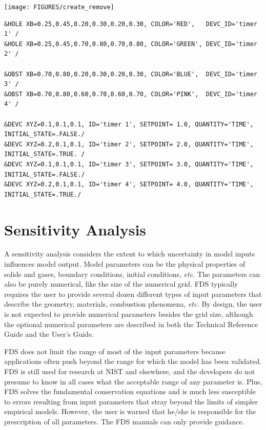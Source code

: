 \documentclass[11pt]{book}
\begin{document}
\vspace{0.2in}
\tiny
\noindent
\begin{minipage}{1.4in}
\texttt{[image: FIGURES/create\_remove]}
\end{minipage}
\hfill
\begin{minipage}{5.5in}
\begin{verbatim}
&HOLE XB=0.25,0.45,0.20,0.30,0.20,0.30, COLOR='RED',   DEVC_ID='timer 1' /
&HOLE XB=0.25,0.45,0.70,0.80,0.70,0.80, COLOR='GREEN', DEVC_ID='timer 2' /

&OBST XB=0.70,0.80,0.20,0.30,0.20,0.30, COLOR='BLUE',  DEVC_ID='timer 3' /
&OBST XB=0.70,0.80,0.60,0.70,0.60,0.70, COLOR='PINK',  DEVC_ID='timer 4' /

&DEVC XYZ=0.1,0.1,0.1, ID='timer 1', SETPOINT= 1.0, QUANTITY='TIME', INITIAL_STATE=.FALSE./
&DEVC XYZ=0.2,0.1,0.1, ID='timer 2', SETPOINT= 2.0, QUANTITY='TIME', INITIAL_STATE=.TRUE. /
&DEVC XYZ=0.1,0.1,0.1, ID='timer 3', SETPOINT= 3.0, QUANTITY='TIME', INITIAL_STATE=.FALSE./
&DEVC XYZ=0.2,0.1,0.1, ID='timer 4', SETPOINT= 4.0, QUANTITY='TIME', INITIAL_STATE=.TRUE./
\end{verbatim}
\end{minipage}
\normalsize








\chapter{Sensitivity Analysis}

A sensitivity  analysis considers the  extent to which  uncertainty in
model  inputs influences  model output.  Model parameters  can  be the
physical properties of solids  and gases, boundary conditions, initial
conditions, {\em  etc.} The parameters  can also be  purely numerical,
like the size  of the numerical grid. FDS  typically requires the user
to  provide several  dozen different  types of  input  parameters that
describe the geometry, materials,  combustion phenomena, {\em etc.} By
design,  the user  is  not expected  to  provide numerical  parameters
besides the grid size,  although the optional numerical parameters are
described in both the Technical Reference Guide and the User's Guide.

FDS does not  limit the range of most of  the input parameters because
applications often push beyond the  range for which the model has been
validated.  FDS is still used  for research at NIST and elsewhere, and
the developers do not presume to know in all cases what the acceptable
range  of   any  parameter  is.  Plus,  FDS   solves  the  fundamental
conservation  equations  and  is   much  less  susceptible  to  errors
resulting  from  input parameters  that  stray  beyond  the limits  of
simpler empirical models.  However, the user is warned  that he/she is
responsible for  the prescription of all parameters.   The FDS manuals
can only provide guidance.
\end{document}
